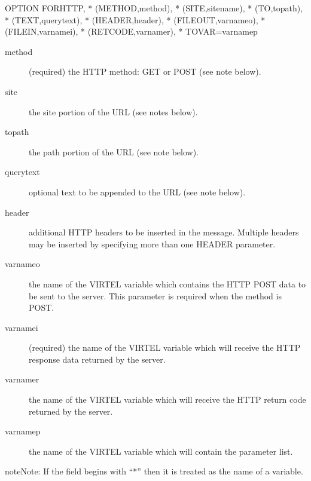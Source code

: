 \documentclass[letterpaper,10pt,english]{sphinxmanual}
\begin{document}
\begin{sphinxVerbatim}[commandchars=\\\{\}]
OPTION\PYGZdl{} FOR\PYGZhy{}HTTP,              *
(METHOD,\PYGZsq{}method\PYGZsq{}),             *
(SITE,\PYGZsq{}sitename\PYGZsq{}),             *
(TO,\PYGZsq{}topath\PYGZsq{}),                 *
(TEXT,\PYGZsq{}querytext\PYGZsq{}),            *
(HEADER,\PYGZsq{}header\PYGZsq{}),             *
(FILE\PYGZhy{}OUT,\PYGZsq{}varnameo\PYGZsq{}),         *
(FILE\PYGZhy{}IN,\PYGZsq{}varnamei\PYGZsq{}),          *
(RET\PYGZhy{}CODE,\PYGZsq{}varnamer\PYGZsq{}),         *
TOVAR=\PYGZsq{}varnamep\PYGZsq{}
\end{sphinxVerbatim}
\begin{description}
\item[{method}] \leavevmode
(required) the HTTP method: GET or POST (see note below).

\item[{site}] \leavevmode
the site portion of the URL (see notes below).

\item[{topath}] \leavevmode
the path portion of the URL (see note below).

\item[{querytext}] \leavevmode
optional text to be appended to the URL (see note below).

\item[{header}] \leavevmode
additional HTTP headers to be inserted in the message. Multiple headers may be inserted by specifying more than one HEADER parameter.

\item[{varnameo}] \leavevmode
the name of the VIRTEL variable which contains the HTTP POST data to be sent to the server. This parameter is required when the method is POST.

\item[{varnamei}] \leavevmode
(required) the name of the VIRTEL variable which will receive the HTTP response data returned by the server.

\item[{varnamer}] \leavevmode
the name of the VIRTEL variable which will receive the HTTP return code returned by the server.

\item[{varnamep}] \leavevmode
the name of the VIRTEL variable which will contain the parameter list.

\end{description}

\begin{sphinxadmonition}{note}{Note:}
If the field begins with “*” then it is treated as the name of a variable.
\end{sphinxadmonition}
\end{document}
